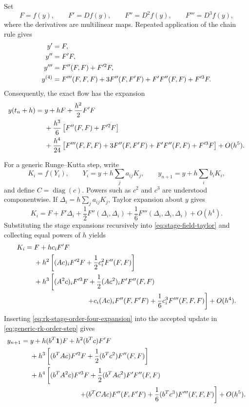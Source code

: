 \documentclass[11pt,a4paper]{article}
\begin{document}
Set
\begin{equation}
 F=f(y),
 \qquad
 F'=Df(y),
 \qquad
 F''=D^2f(y),
 \qquad
 F'''=D^3f(y),
 \label{eq:elementary-differential-notation}
\end{equation}
where the derivatives are multilinear maps.  Repeated application of the
chain rule gives
\begin{align}
 y'&=F,
 \notag\\
 y''&=F'F,
 \notag\\
 y'''&=F''(F,F)+F'^2F,
 \notag\\
 y^{(4)}&=F'''(F,F,F)
 +3F''(F,F'F)
 +F'F''(F,F)
 +F'^3F.
 \label{eq:exact-time-derivatives}
\end{align}
Consequently, the exact flow has the expansion
\begin{align}
 y(t_n+h)={}&y+hF+\frac{h^2}{2}F'F
 \notag\\
 &+\frac{h^3}{6}
 \left[F''(F,F)+F'^2F\right]
 \notag\\
 &+\frac{h^4}{24}
 \left[
 F'''(F,F,F)
 +3F''(F,F'F)
 +F'F''(F,F)
 +F'^3F
 \right]
 +O(h^5).
 \label{eq:exact-order-four-expansion}
\end{align}

For a generic Runge--Kutta step, write
\begin{equation}
 K_i=f(Y_i),
 \qquad
 Y_i=y+h\sum_j a_{ij}K_j,
 \qquad
 y_{n+1}=y+h\sum_i b_iK_i,
 \label{eq:generic-rk-order-step}
\end{equation}
and define $C=\operatorname{diag}(c)$.  Powers such as $c^2$ and $c^3$
are understood componentwise.  If
$\Delta_i=h\sum_j a_{ij}K_j$, Taylor expansion about $y$ gives
\begin{equation}
 K_i
 =F+F'\Delta_i
 +\frac12F''(\Delta_i,\Delta_i)
 +\frac16F'''(\Delta_i,\Delta_i,\Delta_i)
 +O(h^4).
 \label{eq:stage-field-taylor}
\end{equation}
Substituting the stage expansions recursively into
\eqref{eq:stage-field-taylor} and collecting equal powers of $h$ yields
\begin{align}
 K_i={}&F+h c_iF'F
 \notag\\
 &+h^2\left[
 (Ac)_iF'^2F
 +\frac12c_i^2F''(F,F)
 \right]
 \notag\\
 &+h^3\left[
 (A^2c)_iF'^3F
 +\frac12(Ac^2)_iF'F''(F,F)
 \right.
 \notag\\
 &\hspace{27mm}\left.
 +c_i(Ac)_iF''(F,F'F)
 +\frac16c_i^3F'''(F,F,F)
 \right]
 +O(h^4).
 \label{eq:rk-stage-order-four-expansion}
\end{align}
Inserting \eqref{eq:rk-stage-order-four-expansion} into the accepted update
in \eqref{eq:generic-rk-order-step} gives
\begin{align}
 y_{n+1}={}&y+h(b^T\mathbf{1})F
 +h^2(b^Tc)F'F
 \notag\\
 &+h^3\left[
 (b^TAc)F'^2F
 +\frac12(b^Tc^2)F''(F,F)
 \right]
 \notag\\
 &+h^4\left[
 (b^TA^2c)F'^3F
 +\frac12(b^TAc^2)F'F''(F,F)
 \right.
 \notag\\
 &\hspace{25mm}\left.
 +(b^TCAc)F''(F,F'F)
 +\frac16(b^Tc^3)F'''(F,F,F)
 \right]
 +O(h^5).
 \label{eq:rk-order-four-expansion}
\end{align}
\end{document}
